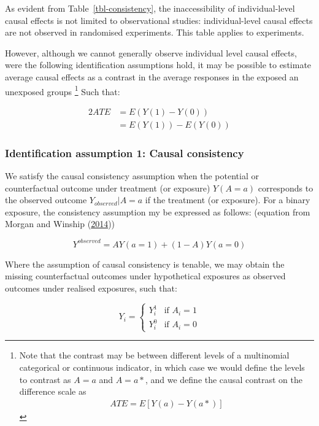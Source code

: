 \documentclass[
  singlecolumn]{report}
\begin{document}
As evident from Table~\ref{tbl-consistency}, the inaccessibility of
individual-level causal effects is not limited to observational studies:
individual-level causal effects are not observed in randomised
experiments. This table applies to experiments.

However, although we cannot generally observe individual level causal
effects, were the following identification assumptions hold, it may be
possible to estimate average causal effects as a contrast in the average
responses in the exposed an unexposed groups \footnote{Note that the
  contrast may be between different levels of a multinomial categorical
  or continuous indicator, in which case we would define the levels to
  contrast as \(A = a\) and \(A = a*\), and we define the causal
  contrast on the difference scale as \begin{align*}
  ATE = E[Y(a) - Y(a*)]
  \end{align*}} Such that:

\begin{alignat*}{2}
ATE & = E(Y(1) - Y(0))\\
& = E(Y(1)) - E(Y(0))
\end{alignat*}

\hypertarget{identification-assumption-1-causal-consistency}{%
\subsubsection{Identification assumption 1: Causal
consistency}\label{identification-assumption-1-causal-consistency}}

We satisfy the causal consistency assumption when the potential or
counterfactual outcome under treatment (or exposure) \(Y(A=a)\)
corresponds to the observed outcome \(Y_{observed}|A=a\) if the
treatment (or exposure). For a binary exposure, the consistency
assumption my be expressed as follows: (equation from Morgan and Winship
(\protect\hyperlink{ref-morgan2014}{2014}))

\[Y^{observed} = AY(a=1) + (1-A)Y(a=0)\]

Where the assumption of causal consistency is tenable, we may obtain the
missing counterfactual outcomes under hypothetical exposures as observed
outcomes under realised exposures, such that:

\[
Y_i = 
\begin{cases} 
Y_i^1 & \text{if } A_i = 1 \\
Y_i^0 & \text{if } A_i = 0 
\end{cases}
\]
\end{document}
